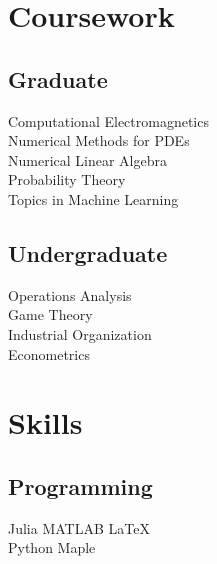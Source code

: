 \documentclass[letterpaper]{pine-resume} %
\begin{document}
\begin{minipage}[t]{0.33\textwidth}


\sectionspace %


\section{Coursework}

\subsection{Graduate}

Computational Electromagnetics \\
Numerical Methods for PDEs \\
Numerical Linear Algebra \\
Probability Theory \\
Topics in Machine Learning

\sectionspace %


\subsection{Undergraduate}

Operations Analysis \\
Game Theory \\
Industrial Organization \\
Econometrics \\

\sectionspace %


\section{Skills}

\subsection{Programming}

Julia \textbullet{} MATLAB \textbullet{} \LaTeX\ \\
Python \textbullet{} Maple\\

\sectionspace %


\end{minipage} %
\end{document}
